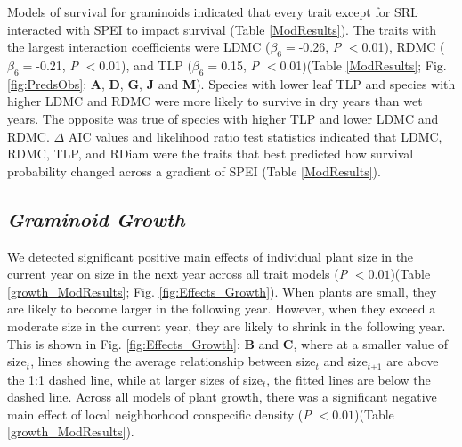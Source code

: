 \documentclass[12pt, letterpaper]{article}
\begin{document}
Models of survival for graminoids indicated that every trait except for SRL interacted with SPEI to impact survival (Table \ref{ModResults}). The traits with the largest interaction coefficients were LDMC ($\beta _6=$-0.26, \textit{P} $<$0.01), RDMC ($\beta _6=$-0.21, \textit{P} $<$0.01), and TLP ($\beta _6=$0.15, \textit{P} $<$0.01)(Table \ref{ModResults}; Fig. \ref{fig:PredsObs}: \textbf{A}, \textbf{D}, \textbf{G}, \textbf{J} and \textbf{M}). Species with lower leaf TLP and species with higher LDMC and RDMC were more likely to survive in dry years than wet years. The opposite was true of species with higher TLP and lower LDMC and RDMC. $\Delta$ AIC values and likelihood ratio test statistics indicated that LDMC, RDMC, TLP, and RDiam were the traits that best predicted how survival probability changed across a gradient of SPEI (Table \ref{ModResults}).

\subsection{\textit{Graminoid Growth}} 
We detected significant positive main effects of individual plant size in the current year on size in the next year across all trait models (\textit{P} $<0.01$)(Table \ref{growth_ModResults}; Fig. \ref{fig:Effects_Growth}). When plants are small, they are likely to become larger in the following year. However, when they exceed a moderate size in the current year, they are likely to shrink in the following year. This is shown in Fig. \ref{fig:Effects_Growth}: \textbf{B} and \textbf{C}, where at a smaller value of size$_{\textit{t}}$, lines showing the average relationship between size$_{\textit{t}}$ and size$_{\textit{t+1}}$ are above the 1:1 dashed line, while at larger sizes of size$_{\textit{t}}$, the fitted lines are below the dashed line. Across all models of plant growth, there was a significant negative main effect of local neighborhood conspecific density (\textit{P} $<0.01$)(Table \ref{growth_ModResults}).
\end{document}
